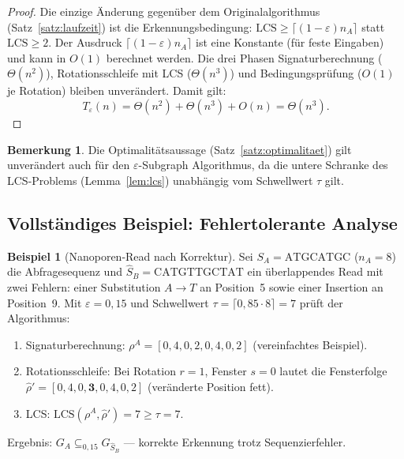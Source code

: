 ﻿\documentclass[a4paper,12pt]{article}
\theoremstyle{definition}
\newtheorem{beispiel}{Beispiel}
\newtheorem{bemerkung}{Bemerkung}
\begin{document}
\begin{proof}
    Die einzige \"{A}nderung gegen\"{u}ber dem Originalalgorithmus
    (Satz~\ref{satz:laufzeit}) ist die Erkennungsbedingung:
    $\mathrm{LCS} \geq \lceil(1-\varepsilon)n_A\rceil$ statt
    $\mathrm{LCS} \geq 2$. Der Ausdruck $\lceil(1-\varepsilon)n_A\rceil$
    ist eine Konstante (f\"{u}r feste Eingaben) und kann in $O(1)$ berechnet
    werden. Die drei Phasen Signaturberechnung ($\Theta(n^2)$),
    Rotationsschleife mit LCS ($\Theta(n^3)$) und Bedingungspr\"{u}fung ($O(1)$
    je Rotation) bleiben unver\"{a}ndert. Damit gilt:
    \[
        T_\varepsilon(n) = \Theta(n^2) + \Theta(n^3) + O(n) = \Theta(n^3).
    \]
\end{proof}

\begin{bemerkung}
    Die Optimalit\"{a}tsaussage (Satz~\ref{satz:optimalitaet}) gilt unver\"{a}ndert
    auch f\"{u}r den $\varepsilon$-Subgraph Algorithmus, da die untere
    Schranke des LCS-Problems (Lemma~\ref{lem:lcs}) unabh\"{a}ngig vom
    Schwellwert $\tau$ gilt.
\end{bemerkung}

\subsection{Vollst\"{a}ndiges Beispiel: Fehlertolerante Analyse}

\begin{beispiel}[Nanoporen-Read nach Korrektur]
    Sei $S_A = \text{ATGCATGC}$ ($n_A = 8$) die Abfragesequenz und
    $\hat{S}_B = \text{CATGTTGCTAT}$ ein \"{u}berlappendes Read mit
    zwei Fehlern: einer Substitution $A \to T$ an Position~5 sowie
    einer Insertion an Position~9. Mit $\varepsilon = 0{,}15$ und
    Schwellwert $\tau = \lceil 0{,}85 \cdot 8 \rceil = 7$ pr\"{u}ft
    der Algorithmus:
    \begin{enumerate}
        \item Signaturberechnung: $\rho^A = [0, 4, 0, 2, 0, 4, 0, 2]$
              (vereinfachtes Beispiel).
        \item Rotationsschleife: Bei Rotation $r = 1$, Fenster $s = 0$
              lautet die Fensterfolge $\hat{\rho}' = [0, 4, 0, \mathbf{3}, 0, 4, 0, 2]$
              (veränderte Position fett).
        \item LCS: $\mathrm{LCS}(\rho^A, \hat{\rho}') = 7 \geq \tau = 7$.
    \end{enumerate}
    Ergebnis: $G_A \subseteq_{0{,}15} G_{\hat{S}_B}$ --- korrekte Erkennung
    trotz Sequenzierfehler.
\end{beispiel}
\end{document}
